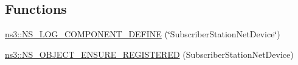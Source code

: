 \subsection*{Functions}
\begin{DoxyCompactItemize}
\item 
\hyperlink{namespacens3_a09ca91fd712152f1c0984a83b9a0f6db}{ns3\+::\+N\+S\+\_\+\+L\+O\+G\+\_\+\+C\+O\+M\+P\+O\+N\+E\+N\+T\+\_\+\+D\+E\+F\+I\+NE} (\char`\"{}Subscriber\+Station\+Net\+Device\char`\"{})
\item 
\hyperlink{namespacens3_aa584a9eddd8c4ec1a56f3c1db222c8b1}{ns3\+::\+N\+S\+\_\+\+O\+B\+J\+E\+C\+T\+\_\+\+E\+N\+S\+U\+R\+E\+\_\+\+R\+E\+G\+I\+S\+T\+E\+R\+ED} (Subscriber\+Station\+Net\+Device)
\end{DoxyCompactItemize}
